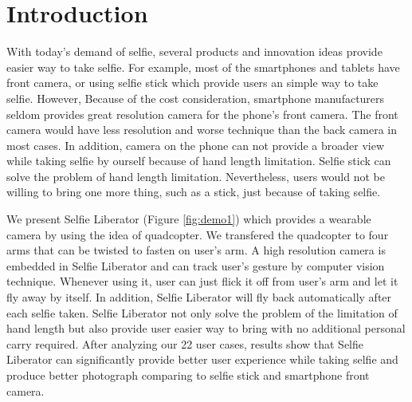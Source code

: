 \documentclass{sig-alternate-ipsn13}
\begin{document}
\section{Introduction}

With today's demand of selfie, several products and innovation ideas provide easier way to take selfie. For example, most of the smartphones and tablets have front camera, or using selfie stick which provide users an simple way to take selfie. 
However, 
Because of the cost consideration, smartphone manufacturers seldom provides great resolution camera for the phone's front camera. The front camera would have less resolution and worse technique than the back camera in most cases. In addition, camera on the phone can not provide a broader view while taking selfie by ourself because of hand length limitation. Selfie stick can solve the problem of hand length limitation. Nevertheless, 
users would not be willing to bring one more thing, such as a stick, just because of taking selfie. 

We present Selfie Liberator (Figure \ref{fig:demo1}) which provides a wearable camera by using the idea of quadcopter. We transfered the quadcopter to four arms that can be twisted to fasten on user's arm. A high resolution camera is embedded in Selfie Liberator and can track user's gesture by computer vision technique. Whenever using it, user can just flick it off from user's arm and let it fly away by itself. In addition, Selfie Liberator will fly back automatically after each selfie taken. Selfie Liberator not only solve the problem of the limitation of hand length 
but also provide user easier way to bring 
with no additional personal carry required.
After analyzing our 22 user cases, results show that Selfie Liberator can significantly provide better user experience while taking selfie and produce better photograph comparing to selfie stick and smartphone front camera.


\end{document}

